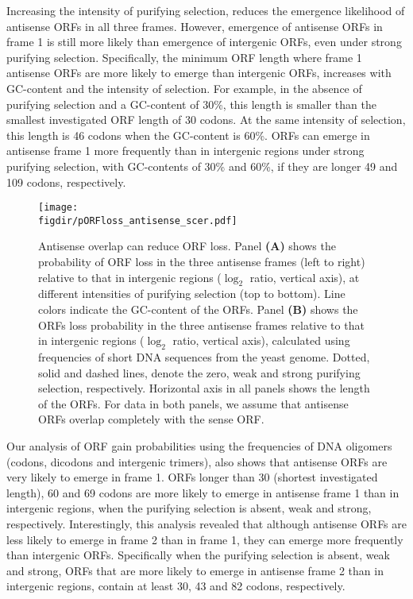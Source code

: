 \documentclass[12pt,a4paper]{article}
\begin{document}
Increasing the intensity of purifying selection, reduces the emergence likelihood of antisense ORFs in all three frames. However, emergence of antisense ORFs in frame 1 is still more likely than emergence of intergenic ORFs, even under strong purifying selection. Specifically, the minimum ORF length where frame 1 antisense ORFs are more likely to emerge than intergenic ORFs, increases with GC-content and the intensity of selection. For example, in the absence of purifying selection and a GC-content of 30\%, this length is smaller than the smallest investigated ORF length of 30 codons. At the same intensity of selection, this length is 46 codons when the GC-content is 60\%. ORFs can emerge in antisense frame 1 more frequently than in intergenic regions under strong purifying selection, with GC-contents of 30\% and 60\%, if they are longer 49 and 109 codons, respectively.

\begin{figure}[!b]
\centering
\texttt{[image: \\figdir/pORFloss\_antisense\_scer.pdf]}
\caption{Antisense overlap can reduce ORF loss. Panel \textbf{(A)} shows the probability of ORF loss in the three antisense frames (left to right) relative to that in intergenic regions ($\log_2$ ratio, vertical axis), at different intensities of purifying selection (top to bottom). Line colors indicate the GC-content of the ORFs. Panel \textbf{(B)} shows the ORFs loss probability in the three antisense frames relative to that in intergenic regions ($\log_2$ ratio, vertical axis), calculated using frequencies of short DNA sequences from the yeast genome. Dotted, solid and dashed lines, denote the zero, weak and strong purifying selection, respectively. Horizontal axis in all panels shows the length of the ORFs. For data in both panels, we assume that antisense ORFs overlap completely with the sense ORF.}
\label{pORFloss}
\end{figure}

Our analysis of ORF gain probabilities using the frequencies of DNA oligomers (codons, dicodons and intergenic trimers), also shows that antisense ORFs are very likely to emerge in frame 1. ORFs longer than 30 (shortest investigated length), 60 and 69 codons are more likely to emerge in antisense frame 1 than in intergenic regions, when the purifying selection is absent, weak and strong, respectively. Interestingly, this analysis revealed that although antisense ORFs are less likely to emerge in frame 2 than in frame 1, they can emerge more frequently than intergenic ORFs. Specifically when the purifying selection is absent, weak and strong, ORFs that are more likely to emerge in antisense frame 2 than in intergenic regions, contain at least 30, 43 and 82 codons, respectively.
\end{document}
